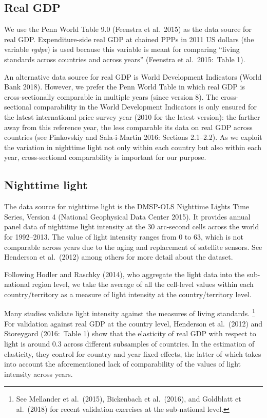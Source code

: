\documentclass[12pt,a4paper]{article}%
\begin{document}
\subsection{Real GDP}
We use the Penn World Table 9.0 (Feenstra et al.\ 2015) as the data source for real GDP. 
Expenditure-side real GDP at chained PPPs in 2011 US dollars (the variable \textit{rgdpe}) is used because this variable is meant for comparing ``living standards across countries and across years'' (Feenstra et al.\ 2015:\ Table 1).

An alternative data source for real GDP is World Development Indicators (World Bank 2018). 
However, we prefer the Penn World Table in which real GDP is cross-sectionally comparable in multiple years (since version 8). 
The cross-sectional comparability in the World Development Indicators is only ensured for the latest international price survey year (2010 for the latest version): the farther away from this reference year, the less comparable its data on real GDP across countries (see Pinkovskiy and Sala-i-Martin 2016: Sections 2.1--2.2).
As we exploit the variation in nighttime light not only within each country but also within each year, cross-sectional comparability is important for our purpose.

\subsection{Nighttime light}
The data source for nighttime light is the DMSP-OLS Nighttime Lights Time Series, Version 4 (National Geophysical Data Center 2015). 
It provides annual panel data of nighttime light intensity at the 30 arc-second cells across the world for 1992--2013. 
The value of light intensity ranges from 0 to 63, which is not comparable across years due to the aging and replacement of satellite sensors. 
See Henderson et al.\ (2012) among others for more detail about the dataset.

Following Hodler and Raschky (2014), who aggregate the light data into the sub-national region level, we take the average of all the cell-level values within each country/territory as a measure of light intensity at the country/territory level.

Many studies validate light intensity against the measures of living standards.%
\footnote{See Mellander et al.\ (2015), Bickenbach et al.\ (2016), and Goldblatt et al.\ (2018) for recent validation exercises at the sub-national level.} 
For validation against real GDP at the country level, Henderson et al.\ (2012) and Storeygard (2016:\ Table 1) show that the elasticity of real GDP with respect to light is around 0.3 across different subsamples of countries. 
In the estimation of elasticity, they control for country and year fixed effects, the latter of which takes into account the aforementioned lack of comparability of the values of light intensity across years.
\end{document}

